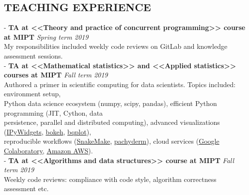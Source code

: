 \documentclass[11pt]{res}
\begin{document}
\begin{resume}
\section{TEACHING EXPERIENCE} 
\vspace{0.1cm}
- \textbf{TA at <<Theory and practice of concurrent programming>> course at MIPT} \hfill{} \textit{Spring term 2019}\\
\hphantom{-} My responsibilities included weekly code reviews on GitLab and knowledge assessment sessions. \vspace{0.2em}\\
- \textbf{TA at <<Mathematical statistics>> and <<Applied statistics>> courses at MIPT} \hfill{} \textit{Fall term 2019}\\
\hphantom{-} Authored a primer in scientific computing for data scientists.%
Topics included: environment setup, \\\hphantom{-} Python data science ecosystem (numpy, scipy, pandas), efficient Python programming (JIT, Cython, data \\\hphantom{-} persistence, parallel and distributed computing), advanced visualizations (\href{https://ipywidgets.readthedocs.io/en/latest/}{IPyWidgets}, \href{https://docs.bokeh.org/en/latest/}{bokeh}, \href{https://github.com/bloomberg/bqplot}{bqplot}), \\\hphantom{-} reproducible workflows (\href{https://snakemake.readthedocs.io/en/stable/}{SnakeMake}, \href{https://github.com/pachyderm/pachyderm}{pachyderm}), cloud services  (\href{https://colab.research.google.com}{Google Colaboratory}, \href{https://aws.amazon.com}{Amazon AWS}).
\vspace{0.2em}\\
- \textbf{TA at <<Algorithms and data structures>> course at MIPT} \hfill{} \textit{Fall term 2019}\\
\hphantom{-} Weekly code reviews: compliance with code style, algorithm correctness assessment etc. \vspace{0.2em}

\end{resume}
\end{document}
